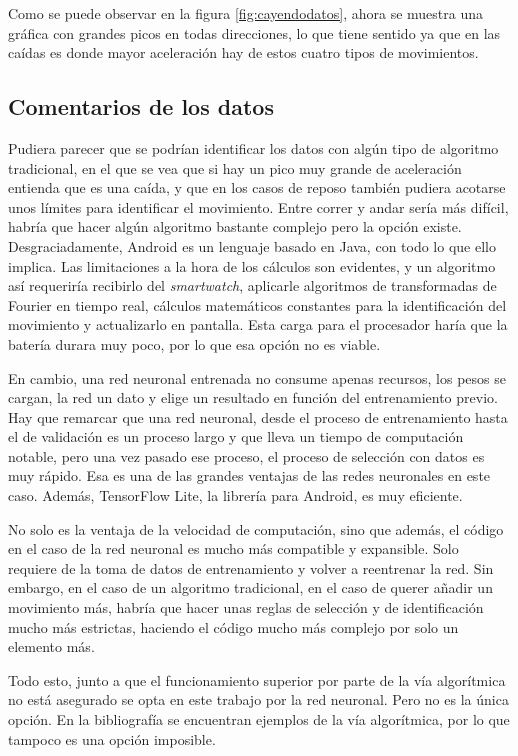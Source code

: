 \documentclass[12pt]{book}
\numberwithin{equation}{section}
\begin{document}
Como se puede observar en la figura \ref{fig:cayendodatos}, ahora se muestra una gráfica con grandes picos en todas direcciones, lo que tiene sentido ya que en las caídas es donde mayor aceleración hay de estos cuatro tipos de movimientos.


\subsection{Comentarios de los datos}

Pudiera parecer que se podrían identificar los datos con algún tipo de algoritmo tradicional, en el que se vea que si hay un pico muy grande de aceleración entienda que es una caída, y que en los casos de reposo también pudiera acotarse unos límites para identificar el movimiento. Entre correr y andar sería más difícil, habría que hacer algún algoritmo bastante complejo pero la opción existe. Desgraciadamente, Android es un lenguaje basado en Java, con todo lo que ello implica. Las limitaciones a la hora de los cálculos son evidentes, y un algoritmo así requeriría recibirlo del \textit{smartwatch}, aplicarle algoritmos de transformadas de Fourier en tiempo real, cálculos matemáticos constantes para la identificación del movimiento y actualizarlo en pantalla. Esta carga para el procesador haría que la batería durara muy poco, por lo que esa opción no es viable.

En cambio, una red neuronal entrenada no consume apenas recursos, los pesos se cargan, la red un dato y elige un resultado en función del entrenamiento previo. Hay que remarcar que una red neuronal, desde el proceso de entrenamiento hasta el de validación es un proceso largo y que lleva un tiempo de computación notable, pero una vez pasado ese proceso, el proceso de selección con datos es muy rápido. Esa es una de las grandes ventajas de las redes neuronales en este caso. Además, TensorFlow Lite, la librería para Android, es muy eficiente.

No solo es la ventaja de la velocidad de computación, sino que además, el código en el caso de la red neuronal es mucho más compatible y expansible. Solo requiere de la toma de datos de entrenamiento y volver a reentrenar la red. Sin embargo, en el caso de un algoritmo tradicional, en el caso de querer añadir un movimiento más, habría que hacer unas reglas de selección y de identificación mucho más estrictas, haciendo el código mucho más complejo por solo un elemento más. 

Todo esto, junto a que el funcionamiento superior por parte de la vía algorítmica no está asegurado se opta en este trabajo por la red neuronal. Pero no es la única opción. En la bibliografía se encuentran ejemplos de la vía algorítmica\cite{s150818901}, por lo que tampoco es una opción imposible.
\end{document}
